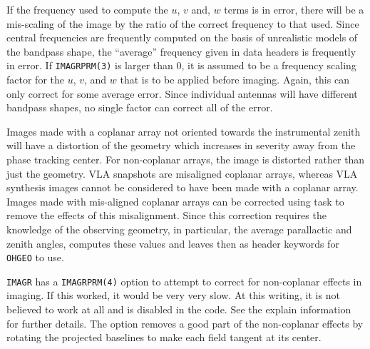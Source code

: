 
     If the frequency used to compute the $u$, $v$ and, $w$ terms is
in error, there will be a mis-scaling of the image by the ratio of the
correct frequency to that used.  Since central frequencies are
frequently computed on the basis of unrealistic models of the bandpass
shape, the ``average'' frequency given in data headers is frequently
in error.  If {\tt IMAGRPRM(3)} is larger than 0, it is assumed to be a
frequency scaling factor for the $u$, $v$, and $w$ that is to be
applied before imaging.  Again, this can only correct for some average
error.  Since individual antennas will have different bandpass shapes,
no single factor can correct all of the error.


     Images made with a coplanar array not oriented towards the
instrumental zenith will have a distortion of the geometry which
increases in severity away from the phase tracking center.  For
non-coplanar arrays, the image is distorted rather than just the
geometry.  VLA snapshots are misaligned coplanar arrays, whereas VLA
synthesis images cannot be considered to have been made with a
coplanar array.  Images made with mis-aligned coplanar arrays can be
corrected using task {\tt {}} to remove the effects of this
misalignment.  Since this correction requires the knowledge of the
observing geometry, in particular, the average parallactic and zenith
angles, {\tt {}} computes these values and leaves then as
header keywords for {\tt OHGEO} to use.


     {\tt IMAGR} has a {\tt IMAGRPRM(4)} option to attempt to correct for
non-coplanar effects in imaging.  If this worked, it would be very
very slow.  At this writing, it is not believed to work at all and is
disabled in the code.  See the explain information for further
details.  The {\tt {}} option removes a good part of the
non-coplanar effects by rotating the projected baselines to make each
field tangent at its center.


